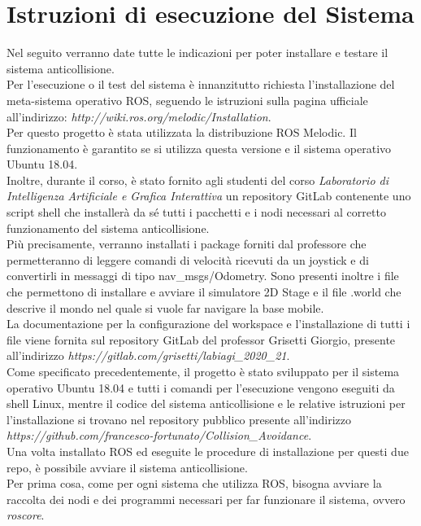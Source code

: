 \section{Istruzioni di esecuzione del Sistema}

Nel seguito verranno date tutte le indicazioni per poter installare e testare il sistema anticollisione.\\ 
Per l'esecuzione o il test del sistema è innanzitutto richiesta l’installazione del meta-sistema operativo ROS, seguendo le istruzioni sulla pagina ufficiale all’indirizzo:  \textit{http://wiki.ros.org/melodic/Installation}. \\
Per questo progetto è stata utilizzata la distribuzione ROS Melodic. Il funzionamento è garantito se si utilizza questa versione e il sistema operativo Ubuntu 18.04.\\
Inoltre, durante il corso, è stato fornito agli studenti del corso \textit{Laboratorio di Intelligenza Artificiale e Grafica Interattiva} un repository GitLab contenente uno script shell che installerà da sé tutti i pacchetti e i nodi necessari al corretto funzionamento del sistema anticollisione.\\
Più precisamente, verranno installati i package forniti dal professore che permetteranno di leggere comandi di velocità ricevuti da un joystick e di convertirli in messaggi di tipo nav\_msgs/Odometry. Sono presenti inoltre i file che permettono di installare e avviare il simulatore 2D Stage e il file .world che descrive il mondo nel quale si vuole far navigare la base mobile.\\
La documentazione per la configurazione del workspace e l’installazione di tutti i file viene fornita sul repository GitLab del professor Grisetti Giorgio, presente all’indirizzo \textit{https://gitlab.com/grisetti/labiagi\_2020\_21}.\\
Come specificato precedentemente, il progetto è stato sviluppato per il sistema operativo Ubuntu 18.04 e tutti i comandi per l’esecuzione vengono eseguiti da shell Linux, mentre il codice del sistema anticollisione e le relative istruzioni per l’installazione si trovano nel repository pubblico presente all’indirizzo \textit{https://github.com/francesco-fortunato/Collision\_Avoidance}.\\
Una volta installato ROS ed eseguite le procedure di installazione per questi due repo, è possibile avviare il sistema anticollisione.\\
Per prima cosa, come per ogni sistema che utilizza ROS, bisogna avviare la raccolta dei nodi e dei programmi necessari per far funzionare il sistema, ovvero \textit{roscore}.\\
